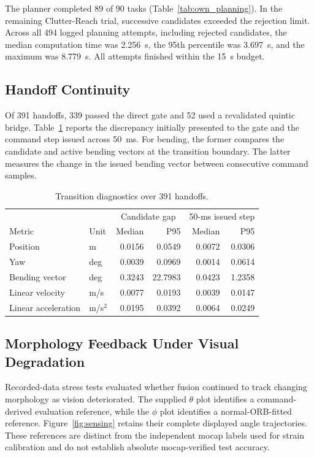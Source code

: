 \documentclass[journal,twoside]{IEEEtran}
\begin{document}
The planner completed 89 of 90 tasks (Table~\ref{tab:own_planning}). In the remaining Clutter-Reach trial, successive candidates exceeded the rejection limit. Across all 494 logged planning attempts, including rejected candidates, the median computation time was 2.256~s, the 95th percentile was 3.697~s, and the maximum was 8.779~s. All attempts finished within the 15~s budget.

\subsection{Handoff Continuity}
Of 391 handoffs, 339 passed the direct gate and 52 used a revalidated quintic bridge. Table~\ref{tab:handoff} reports the discrepancy initially presented to the gate and the command step issued across 50~ms. For bending, the former compares the candidate and active bending vectors at the transition boundary. The latter measures the change in the issued bending vector between consecutive command samples.

\begin{table}[t]
\centering
\caption{Transition diagnostics over 391 handoffs.}
\label{tab:handoff}
\footnotesize\setlength{\tabcolsep}{3pt}
\begin{tabular}{llrrrr}
\toprule
 & & \multicolumn{2}{c}{Candidate gap} & \multicolumn{2}{c}{50-ms issued step}\\
Metric & Unit & Median & P95 & Median & P95\\\midrule
Position & m & 0.0156 & 0.0549 & 0.0072 & 0.0306\\
Yaw & deg & 0.0039 & 0.0969 & 0.0014 & 0.0614\\
Bending vector & deg & 0.3243 & 22.7983 & 0.0423 & 1.2358\\
Linear velocity & m/s & 0.0077 & 0.0193 & 0.0039 & 0.0147\\
Linear acceleration & m/s$^2$ & 0.0195 & 0.0392 & 0.0064 & 0.0249\\\bottomrule
\end{tabular}
\end{table}



\subsection{Morphology Feedback Under Visual Degradation}
Recorded-data stress tests evaluated whether fusion continued to track changing morphology as vision deteriorated. The supplied $\theta$ plot identifies a command-derived evaluation reference, while the $\phi$ plot identifies a normal-ORB-fitted reference. Figure~\ref{fig:sensing} retains their complete displayed angle trajectories. These references are distinct from the independent mocap labels used for strain calibration and do not establish absolute mocap-verified test accuracy.
\end{document}
